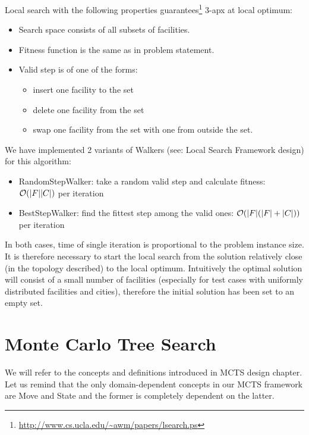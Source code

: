 Local search with the following properties
guarantees\footnote{\url{http://www.cs.ucla.edu/~awm/papers/lsearch.ps}}
3-apx at local optimum:
\begin{itemize}
\item Search space consists of all subsets of facilities.
\item Fitness function is the same as in problem statement.
\item Valid step is of one of the forms:
	\begin{itemize}
	\item insert one facility to the set
	\item delete one facility from the set
	\item swap one facility from the set with one from outside the set.
	\end{itemize}
\end{itemize}

We have implemented 2 variants of Walkers (see: Local Search Framework design)
for this algorithm:
\begin{itemize}
\item RandomStepWalker: take a random valid step and calculate fitness: $\mathcal{O}(|F||C|)$ per iteration
\item BestStepWalker: find the fittest step among the valid ones: $\mathcal{O}(|F|(|F|+|C|))$ per iteration
\end{itemize}

In both cases, time of single iteration is proportional to the problem
instance size. It is therefore necessary to start the local search from
the solution relatively close (in the topology described) to the local
optimum. Intuitively the optimal solution will consist of a small number
of facilities (especially for test cases with uniformly distributed facilities and cities),
therefore the initial solution has been set to an empty set.

\section{\label{MCTS_FL}Monte Carlo Tree Search}

We will refer to the concepts and definitions introduced in MCTS design
chapter. Let us remind that the only domain-dependent concepts in our MCTS
framework are Move and State and the former is completely dependent on the
latter.

